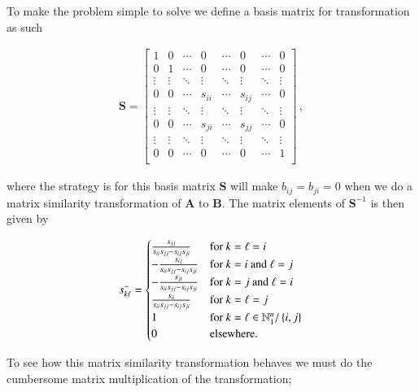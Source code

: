\documentclass[11pt,english,a4paper]{article}
\begin{document}
\begin{flushleft}
To make the problem simple to solve we define a basis matrix for transformation as such

\begin{align}
\mathbf{S} = \begin{bmatrix} 1 & 0 & \cdots & 0 & \cdots & 0 & \cdots & 0  \\ 0 & 1 & \cdots & 0 & \cdots & 0 & \cdots & 0 \\ \vdots & \vdots & \ddots & \vdots & \ddots & \vdots & \ddots & \vdots  \\ 0 & 0 & \cdots & s_{ii} & \cdots & s_{ij} & \cdots & 0\\ \vdots & \vdots & \ddots & \vdots & \ddots & \vdots & \ddots & \vdots \\ 0 & 0 & \cdots & s_{ji} & \cdots & s_{jj} & \cdots & 0\\ \vdots & \vdots & \ddots & \vdots & \ddots & \vdots & \ddots & \vdots \\ 0 & 0 & \cdots & 0 & \cdots & 0 & \cdots & 1\\\end{bmatrix} \,,
\label{eq_1}
\end{align}

where the strategy is for this basis matrix $\mathbf{S}$ will make $b_{ij} = b_{ji} = 0$ when we do a matrix similarity transformation of $\mathbf{A}$ to $\mathbf{B}$. The matrix elements of $\mathbf{S}^{-1}$ is then given by

\begin{align*}
s_{k\ell}^- = \begin{cases} \frac{s_{jj}}{s_{ii}s_{jj}-s_{ij}s_{ji}} & \text{for $k=\ell=i$} \\ -\frac{s_{ij}}{s_{ii}s_{jj}-s_{ij}s_{ji}} & \text{for $k=i$ and $\ell=j$} \\ -\frac{s_{ji}}{s_{ii}s_{jj}-s_{ij}s_{ji}} & \text{for $k=j$ and $\ell=i$} \\ \frac{s_{ii}}{s_{ii}s_{jj}-s_{ij}s_{ji}} & \text{for $k=\ell=j$} \\ 1 & \text{for $k=\ell\in\mathbb{N}_1^n/\left\lbrace{i,j}\right\rbrace$} \\ 0 & \text{elsewhere.} \end{cases}
\end{align*}

To see how this matrix similarity transformation behaves we must do the cumbersome matrix multiplication of the transformation;


\end{flushleft}
\end{document}
